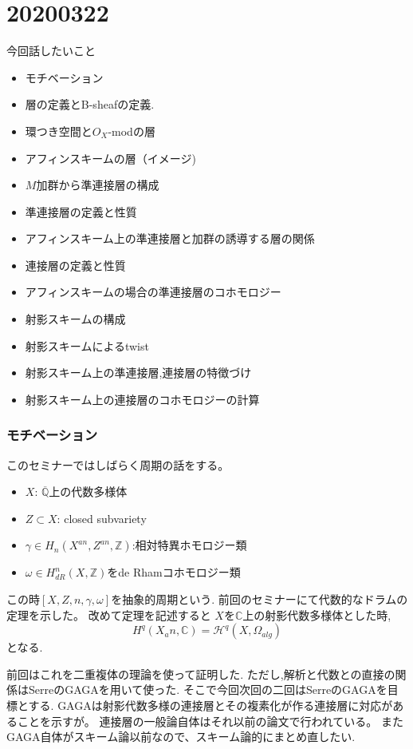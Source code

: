 
\chapter{20200322}
今回話したいこと
\begin{itemize}
    \item モチベーション
    \item 層の定義とB-sheafの定義.
    \item 環つき空間と$O_X$-modの層
    \item アフィンスキームの層（イメージ)
    \item $M$加群から準連接層の構成
    \item 準連接層の定義と性質
    \item アフィンスキーム上の準連接層と加群の誘導する層の関係
    \item 連接層の定義と性質
    \item アフィンスキームの場合の準連接層のコホモロジー
    \item 射影スキームの構成
    \item 射影スキームによるtwist
    \item 射影スキーム上の準連接層,連接層の特徴づけ
    \item 射影スキーム上の連接層のコホモロジーの計算
\end{itemize}

\subsection{モチベーション}
このセミナーではしばらく周期の話をする。
\begin{itemize}
\item $X$: $\overline{\mathbb{Q}}$上の代数多様体
\item $Z \subset X$: closed subvariety
\item $\gamma \in H_n(X^{an}, Z^{an}, \mathbb{Z})$:相対特異ホモロジー類
\item $\omega \in H_{dR}^n(X, \mathbb{Z})$をde Rhamコホモロジー類
\end{itemize}
この時$[X, Z, n ,\gamma, \omega]$を抽象的周期という.
前回のセミナーにて代数的なドラムの定理を示した。
改めて定理を記述すると
$X$を$\mathbb{C}$上の射影代数多様体とした時,
\begin{equation*}
  H^q(X_an, \mathbb{C}) = \mathcal{H}^q(X, \Omega_{alg})
\end{equation*}
となる.

前回はこれを二重複体の理論を使って証明した.
ただし,解析と代数との直接の関係はSerreのGAGAを用いて使った.
そこで今回次回の二回はSerreのGAGAを目標とする.
GAGAは射影代数多様の連接層とその複素化が作る連接層に対応があることを示すが。
連接層の一般論自体はそれ以前の論文で行われている。
またGAGA自体がスキーム論以前なので、スキーム論的にまとめ直したい.

